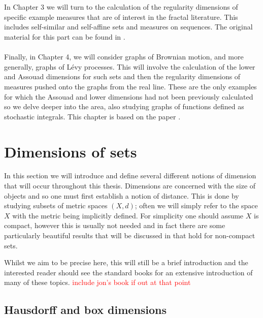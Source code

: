 \\ \\
In Chapter 3 we will turn to the calculation of the regularity dimensions of specific example measures that are of interest in the fractal literature. This includes self-similar and self-affine sets and measures on sequences. The original material for this part can be found in \cite{fraser-howroyd}. 
\\ \\
Finally, in Chapter 4, we will consider graphs of Brownian motion, and more generally, graphs of L\'evy processes. This will involve the calculation of the lower and Assouad dimensions for such sets and then the regularity dimensions of measures pushed onto the graphs from the real line. These are the only examples for which the Assouad and lower dimensions had not been previously calculated so we delve deeper into the area, also studying graphs of functions defined as stochastic integrals. This chapter is based on the paper \cite{howroyd-yu}.






\section{Dimensions of sets}
\label{sec:intro-sets}

In this section we will introduce and define several different notions of dimension that will occur throughout this thesis. Dimensions are concerned with the size of objects and so one must first establish a notion of distance. This is done by studying subsets of metric spaces $(X,d)$; often we will simply refer to the space $X$ with the metric being implicitly defined. For simplicity one should assume $X$ is compact, however this is usually not needed and in fact there are some particularly beautiful results that will be discussed in \label{sec:intro-ass} that hold for non-compact sets.

Whilst we aim to be precise here, this will still be a brief introduction and the interested reader should see the standard books \cite{falconer, falconer2, mattila} for an extensive introduction of many of these topics. \textcolor{red}{include jon's book if out at that point} 



\subsection{Hausdorff and box dimensions}
\label{sec:intro-haus-box}

